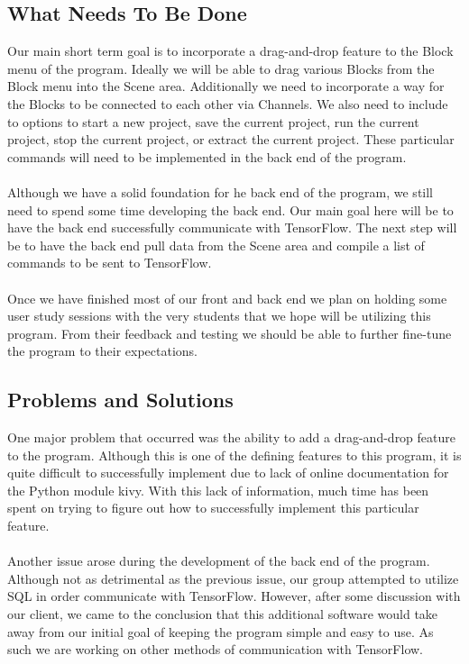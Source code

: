 \documentclass[journal,10pt,onecolumn,compsoc]{IEEEtran} \usepackage[margin=1.0in]{geometry} \usepackage{pdfpages}
\begin{document}
\subsection{What Needs To Be Done}
\noindent Our main short term goal is to incorporate a drag-and-drop feature to the Block menu of the program. Ideally we will be able to drag various Blocks from the Block menu into the Scene area. Additionally we need to incorporate a way for the Blocks to be connected to each other via Channels. We also need to include to options to start a new project, save the current project, run the current project, stop the current project, or extract the current project. These particular commands will need to be implemented in the back end of the program.\\\\
\noindent Although we have a solid foundation for he back end of the program, we still need to spend some time developing the back end. Our main goal here will be to have the back end successfully communicate with TensorFlow\texttrademark. The next step will be to have the back end pull data from the Scene area and compile a list of commands to be sent to TensorFlow\texttrademark.\\\\
\indent Once we have finished most of our front and back end we plan on holding some user study sessions with the very students that we hope will be utilizing this program. From their feedback and testing we should be able to further fine-tune the program to their expectations.
\subsection{Problems and Solutions}
\noindent One major problem that occurred was the ability to add a drag-and-drop feature to the program. Although this is one of the defining features to this program, it is quite difficult to successfully implement due to lack of online documentation for the Python module kivy. With this lack of information, much time has been spent on trying to figure out how to successfully implement this particular feature.\\\\
\noindent Another issue arose during the development of the back end of the program. Although not as detrimental as the previous issue, our group attempted to utilize SQL in order communicate with TensorFlow\texttrademark. However, after some discussion with our client, we came to the conclusion that this additional software would take away from our initial goal of keeping the program simple and easy to use. As such we are working on other methods of communication with TensorFlow\texttrademark.
\end{document}
